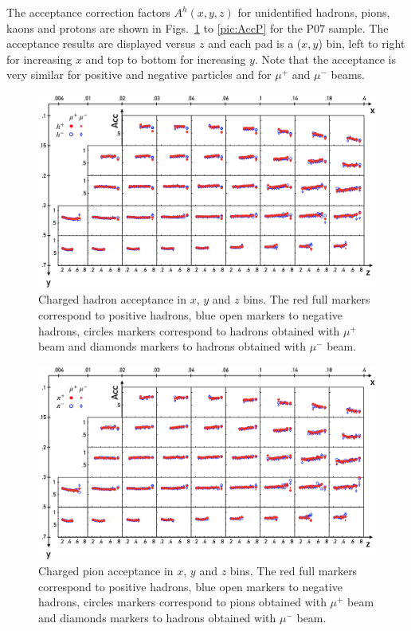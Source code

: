 The acceptance correction factors $A^h(x,y,z)$ for unidentified hadrons, pions, kaons and protons are shown in Figs.~\ref{pic:AccH} to \ref{pic:AccP} for the P$07$ sample. The acceptance results are displayed versus $z$ and each pad is a ($x,y$) bin, left to right for increasing $x$ and top to bottom for increasing $y$. Note that the acceptance is very similar for positive and negative particles and for $\mu^+$ and $\mu^-$ beams.

\begin{figure}
  \centering
	\includegraphics[scale=0.7]{./gfx/AccH.png}
	\caption{Charged hadron acceptance in $x$, $y$ and $z$ bins. The red full markers correspond to positive hadrons, blue open markers to negative hadrons, circles markers correspond to hadrons obtained with $\mu^+$ beam and diamonds markers to hadrons obtained with $\mu^-$ beam.}
	\label{pic:AccH}
\end{figure}

\begin{figure}
  \centering
	\includegraphics[scale=0.7]{./gfx/AccPi.png}
	\caption{Charged pion acceptance in $x$, $y$ and $z$ bins. The red full markers correspond to positive hadrons, blue open markers to negative hadrons, circles markers correspond to pions obtained with $\mu^+$ beam and diamonds markers to hadrons obtained with $\mu^-$ beam.}
	\label{pic:AccPi}
\end{figure}

